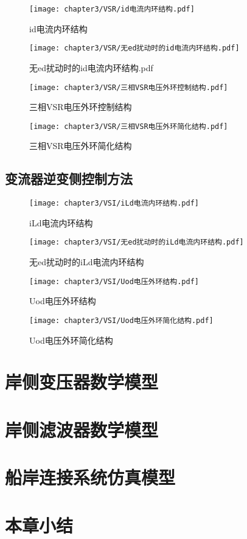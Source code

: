 \begin{figure}[!htp]
	\centering
	\texttt{[image: chapter3/VSR/id电流内环结构.pdf]}
	\caption{id电流内环结构}
	\label{fig:id电流内环结构}
\end{figure}

\begin{figure}[!htp]
	\centering
	\texttt{[image: chapter3/VSR/无ed扰动时的id电流内环结构.pdf]}
	\caption{无ed扰动时的id电流内环结构.pdf}
	\label{fig:无ed扰动时的id电流内环结构.pdf}
\end{figure}

\begin{figure}[!htp]
	\centering
	\texttt{[image: chapter3/VSR/三相VSR电压外环控制结构.pdf]}
	\caption{三相VSR电压外环控制结构}
	\label{fig:三相VSR电压外环控制结构}
\end{figure}

\begin{figure}[!htp]
	\centering
	\texttt{[image: chapter3/VSR/三相VSR电压外环简化结构.pdf]}
	\caption{三相VSR电压外环简化结构}
	\label{fig:三相VSR电压外环简化结构}
\end{figure}

\subsection{变流器逆变侧控制方法}

\zhlipsum[3]

\begin{figure}[!htp]
	\centering
	\texttt{[image: chapter3/VSI/iLd电流内环结构.pdf]}
	\caption{iLd电流内环结构}
	\label{fig:iLd电流内环结构}
\end{figure}

\begin{figure}[!htp]
	\centering
	\texttt{[image: chapter3/VSI/无ed扰动时的iLd电流内环结构.pdf]}
	\caption{无ed扰动时的iLd电流内环结构}
	\label{fig:无ed扰动时的iLd电流内环结构}
\end{figure}

\begin{figure}[!htp]
	\centering
	\texttt{[image: chapter3/VSI/Uod电压外环结构.pdf]}
	\caption{Uod电压外环结构}
	\label{fig:Uod电压外环结构}
\end{figure}

\begin{figure}[!htp]
	\centering
	\texttt{[image: chapter3/VSI/Uod电压外环简化结构.pdf]}
	\caption{Uod电压外环简化结构}
	\label{fig:Uod电压外环简化结构}
\end{figure}


\section{岸侧变压器数学模型}


\section{岸侧滤波器数学模型}


\section{船岸连接系统仿真模型}


\section{本章小结}
